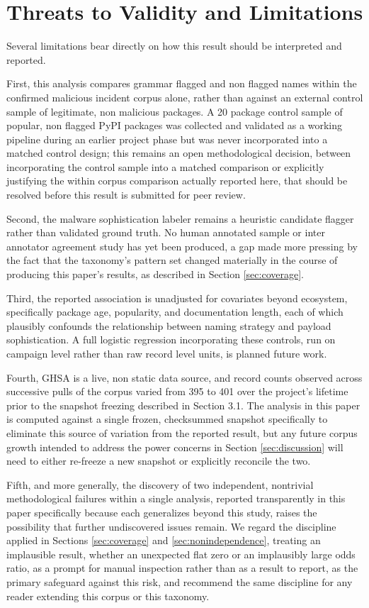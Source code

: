 \documentclass[journal]{IEEEtran}
\begin{document}
\section{Threats to Validity and Limitations}
\label{sec:limitations}

Several limitations bear directly on how this result should be interpreted and reported.

First, this analysis compares grammar flagged and non flagged names within the confirmed malicious incident corpus alone, rather than against an external control sample of legitimate, non malicious packages. A 20 package control sample of popular, non flagged PyPI packages was collected and validated as a working pipeline during an earlier project phase but was never incorporated into a matched control design; this remains an open methodological decision, between incorporating the control sample into a matched comparison or explicitly justifying the within corpus comparison actually reported here, that should be resolved before this result is submitted for peer review.

Second, the malware sophistication labeler remains a heuristic candidate flagger rather than validated ground truth. No human annotated sample or inter annotator agreement study has yet been produced, a gap made more pressing by the fact that the taxonomy's pattern set changed materially in the course of producing this paper's results, as described in Section \ref{sec:coverage}.

Third, the reported association is unadjusted for covariates beyond ecosystem, specifically package age, popularity, and documentation length, each of which plausibly confounds the relationship between naming strategy and payload sophistication. A full logistic regression incorporating these controls, run on campaign level rather than raw record level units, is planned future work.

Fourth, GHSA is a live, non static data source, and record counts observed across successive pulls of the corpus varied from 395 to 401 over the project's lifetime prior to the snapshot freezing described in Section 3.1. The analysis in this paper is computed against a single frozen, checksummed snapshot specifically to eliminate this source of variation from the reported result, but any future corpus growth intended to address the power concerns in Section \ref{sec:discussion} will need to either re-freeze a new snapshot or explicitly reconcile the two.

Fifth, and more generally, the discovery of two independent, nontrivial methodological failures within a single analysis, reported transparently in this paper specifically because each generalizes beyond this study, raises the possibility that further undiscovered issues remain. We regard the discipline applied in Sections \ref{sec:coverage} and \ref{sec:nonindependence}, treating an implausible result, whether an unexpected flat zero or an implausibly large odds ratio, as a prompt for manual inspection rather than as a result to report, as the primary safeguard against this risk, and recommend the same discipline for any reader extending this corpus or this taxonomy.
\end{document}
